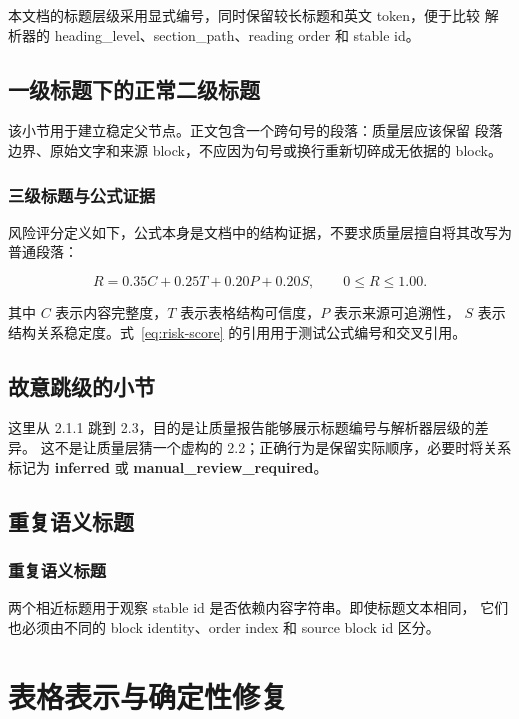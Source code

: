 \documentclass[UTF8,a4paper,11pt]{ctexart}
\newcommand{\risk}[1]{\textcolor{warn}{\textbf{#1}}}
\begin{document}
本文档的标题层级采用显式编号，同时保留较长标题和英文 token，便于比较
解析器的 heading\_level、section\_path、reading order 和 stable id。

\subsection{一级标题下的正常二级标题}

该小节用于建立稳定父节点。正文包含一个跨句号的段落：质量层应该保留
段落边界、原始文字和来源 block，不应因为句号或换行重新切碎成无依据的 block。

\subsubsection{三级标题与公式证据}

风险评分定义如下，公式本身是文档中的结构证据，不要求质量层擅自将其改写为普通段落：

\begin{equation}
  R = 0.35C + 0.25T + 0.20P + 0.20S,
  \qquad 0 \leq R \leq 1.00.
  \label{eq:risk-score}
\end{equation}

其中 $C$ 表示内容完整度，$T$ 表示表格结构可信度，$P$ 表示来源可追溯性，
$S$ 表示结构关系稳定度。式~\eqref{eq:risk-score} 的引用用于测试公式编号和交叉引用。

\setcounter{subsection}{2}
\subsection{故意跳级的小节}

这里从 2.1.1 跳到 2.3，目的是让质量报告能够展示标题编号与解析器层级的差异。
这不是让质量层猜一个虚构的 2.2；正确行为是保留实际顺序，必要时将关系标记为
\risk{inferred} 或 \risk{manual\_review\_required}。

\subsection{重复语义标题}

\subsubsection{重复语义标题}

两个相近标题用于观察 stable id 是否依赖内容字符串。即使标题文本相同，
它们也必须由不同的 block identity、order index 和 source block id 区分。

\section{表格表示与确定性修复}
\end{document}
